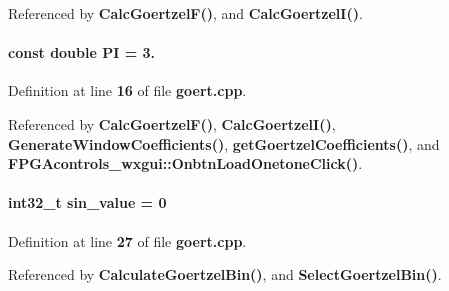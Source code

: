 Referenced by {\bf Calc\+Goertzel\+F()}, and {\bf Calc\+Goertzel\+I()}.

\paragraph[{PI}]{\setlength{\rightskip}{0pt plus 5cm}const double PI = 3.\hspace{0.3cm}{\ttfamily [static]}}\label{goert_8cpp_a952eac791b596a61bba0a133a3bb439f}


Definition at line {\bf 16} of file {\bf goert.\+cpp}.



Referenced by {\bf Calc\+Goertzel\+F()}, {\bf Calc\+Goertzel\+I()}, {\bf Generate\+Window\+Coefficients()}, {\bf get\+Goertzel\+Coefficients()}, and {\bf F\+P\+G\+Acontrols\+\_\+wxgui\+::\+Onbtn\+Load\+Onetone\+Click()}.

\paragraph[{sin\+\_\+value}]{\setlength{\rightskip}{0pt plus 5cm}int32\+\_\+t sin\+\_\+value = 0\hspace{0.3cm}{\ttfamily [static]}}\label{goert_8cpp_a79f8b3bc41e9396222dd2f22368ce4a2}


Definition at line {\bf 27} of file {\bf goert.\+cpp}.



Referenced by {\bf Calculate\+Goertzel\+Bin()}, and {\bf Select\+Goertzel\+Bin()}.

